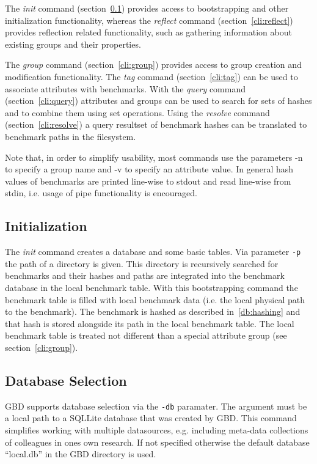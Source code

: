 \documentclass{easychair}
\begin{document}
The \emph{init} command (section~\ref{cli:init}) provides access to bootstrapping and other initialization functionality, 
whereas the \emph{reflect} command (section~\ref{cli:reflect}) provides reflection related functionality, such as gathering information about existing groups and their properties. 

The \emph{group} command (section~\ref{cli:group}) provides access to group creation and modification functionality. 
The \emph{tag} command (section~\ref{cli:tag}) can be used to associate attributes with benchmarks.
With the \emph{query} command (section~\ref{cli:query}) attributes and groups can be used to search for sets of hashes and to combine them using set operations. Using the \emph{resolve} command (section~\ref{cli:resolve}) a query resultset of benchmark hashes can be translated to benchmark paths in the filesystem.

Note that, in order to simplify usability, most commands use the parameters \textsf{-n} to specify a group name and \textsf{-v} to specify an attribute value. In general hash values of benchmarks are printed line-wise to \textsf{stdout} and read line-wise from \textsf{stdin}, i.e. usage of pipe functionality is encouraged.


\subsection{Initialization}
\label{cli:init}

The \emph{init} command creates a database and some basic tables.
Via parameter \texttt{-p} the path of a directory is given. This directory is recursively searched for benchmarks and their hashes and paths are integrated into the benchmark database in the local benchmark table. With this bootstrapping command the benchmark table is filled with local benchmark data (i.e. the local physical path to the benchmark). The benchmark is hashed as described in~\ref{db:hashing} and that hash is stored alongside its path in the local benchmark table. The local benchmark table is treated not different than a special attribute group (see section~\ref{cli:group}).


\subsection{Database Selection}

GBD supports database selection via the \texttt{\textendash-db} paramater.
The argument must be a local path to a SQLLite database that was created by GBD. 
This command simplifies working with multiple datasources, 
e.g. including meta-data collections of colleagues in ones own research.
If not specified otherwise the default database ``local.db'' in the GBD directory is used. 
\end{document}
